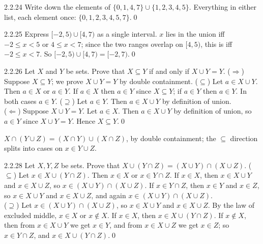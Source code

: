 \begin{bookex}[essential]{2.2.24}
Write down the elements of $\{0,1,4,7\}\cup\{1,2,3,4,5\}$.
\solution
Everything in either list, each element once: $\{0,1,2,3,4,5,7\}$.\qed
\end{bookex}

\begin{bookex}[recommended]{2.2.25}
Express $[-2,5)\cup[4,7)$ as a single interval.
\solution
$x$ lies in the union iff $-2\le x<5$ or $4\le x<7$; since the two ranges overlap on $[4,5)$, this is iff $-2\le x<7$. So $[-2,5)\cup[4,7)=[-2,7)$.\qed
\end{bookex}

\begin{bookex}[essential]{2.2.26}
Let $X$ and $Y$ be sets. Prove that $X\subseteq Y$ if and only if $X\cup Y=Y$.
\solution
($\Rightarrow$) Suppose $X\subseteq Y$; we prove $X\cup Y=Y$ by double containment. ($\subseteq$) Let $a\in X\cup Y$. Then $a\in X$ or $a\in Y$. If $a\in X$ then $a\in Y$ since $X\subseteq Y$; if $a\in Y$ then $a\in Y$. In both cases $a\in Y$. ($\supseteq$) Let $a\in Y$. Then $a\in X\cup Y$ by definition of union.\\
($\Leftarrow$) Suppose $X\cup Y=Y$. Let $a\in X$. Then $a\in X\cup Y$ by definition of union, so $a\in Y$ since $X\cup Y=Y$. Hence $X\subseteq Y$.\qed
\end{bookex}

\begin{result}
$X\cap(Y\cup Z)=(X\cap Y)\cup(X\cap Z)$, by double containment; the $\subseteq$ direction splits into cases on $x\in Y\cup Z$.
\end{result}

\begin{bookex}[essential]{2.2.28}
Let $X,Y,Z$ be sets. Prove that $X\cup(Y\cap Z)=(X\cup Y)\cap(X\cup Z)$.
\solution
($\subseteq$) Let $x\in X\cup(Y\cap Z)$. Then $x\in X$ or $x\in Y\cap Z$. If $x\in X$, then $x\in X\cup Y$ and $x\in X\cup Z$, so $x\in(X\cup Y)\cap(X\cup Z)$. If $x\in Y\cap Z$, then $x\in Y$ and $x\in Z$, so $x\in X\cup Y$ and $x\in X\cup Z$, and again $x\in(X\cup Y)\cap(X\cup Z)$.\\
($\supseteq$) Let $x\in(X\cup Y)\cap(X\cup Z)$, so $x\in X\cup Y$ and $x\in X\cup Z$. By the law of excluded middle, $x\in X$ or $x\notin X$. If $x\in X$, then $x\in X\cup(Y\cap Z)$. If $x\notin X$, then from $x\in X\cup Y$ we get $x\in Y$, and from $x\in X\cup Z$ we get $x\in Z$; so $x\in Y\cap Z$, and $x\in X\cup(Y\cap Z)$.\qed
\end{bookex}

